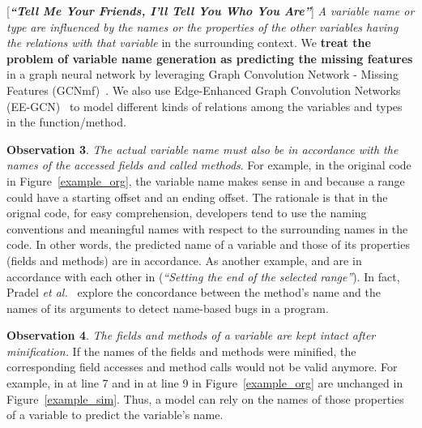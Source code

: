 \vspace{2pt}
 [{\bf {\em ``Tell Me Your Friends, I'll Tell
    You Who You Are''}}]
          {\em A variable name or type are influenced by the
  names or the properties of the other variables having the relations
  with that variable} in the surrounding context. We {\bf treat the
  problem of variable name generation as predicting the missing
  features} in a graph neural network by leveraging Graph Convolution
Network - Missing Features (GCNmf)~\cite{GCNmf}.  We also use
Edge-Enhanced Graph Convolution Networks (EE-GCN)~\cite{ee-gcn} to
model different kinds of relations among the
variables and types in the function/method.



\vspace{2pt} \textbf{Observation 3}. {\em The actual variable name
  must also be in accordance with the names of the accessed fields and
  called methods}. For example, in the original code in
Figure~\ref{example_org}, the variable name  makes sense
in  and  because a
range could have a starting offset and an ending offset. The rationale
is that in the orignal code, for easy comprehension, developers tend
to use the naming conventions and meaningful names with respect to the
surrounding names in the code. In other words, the predicted name of a
variable and those of its properties (fields and methods) are in
accordance. As another example,  and
 are in accordance with each other in
 ({\em ``Setting the end of the
  selected range''}). In fact, Pradel {\em et
  al.}~\cite{deepbugs-oopsla18} explore the concordance between the
method's name and the names of its arguments to detect name-based bugs
in a program.


\vspace{2pt}
\textbf{Observation 4}. {\em The fields and methods of a variable are
  kept intact after minification.} If the names of the fields and
methods were minified, the corresponding field accesses and method
calls would not be valid anymore. For example,  in
 at line 7 and  in
 at line 9 in Figure~\ref{example_org} are
unchanged in Figure~\ref{example_sim}. Thus, a model can rely
on the names of those properties of a variable to predict the
variable's name.

